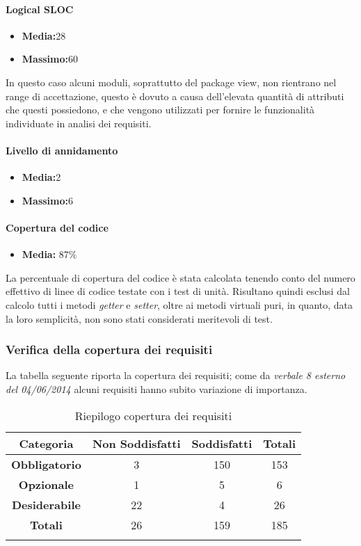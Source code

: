 \paragraph{Logical SLOC}
\begin{itemize}
\item{\textbf{Media:}28} 
\item{\textbf{Massimo:}60}
\end{itemize}
In questo caso alcuni moduli, soprattutto del package view, non rientrano nel range di accettazione, questo è dovuto a causa dell'elevata quantità di attributi che questi possiedono, e che vengono utilizzati per fornire le funzionalità individuate in analisi dei requisiti.

\paragraph{Livello di annidamento}
\begin{itemize}
\item{\textbf{Media:}2}
\item{\textbf{Massimo:}6} 
\end{itemize}


\paragraph{Copertura del codice}
\begin{itemize}
\item{\textbf{Media:} 87\%} 
\end{itemize}
La percentuale di copertura del codice è stata calcolata tenendo conto del numero effettivo di linee di codice testate con i test di unità. Risultano quindi esclusi dal calcolo tutti i metodi \emph{getter} e \emph{setter}, oltre ai metodi virtuali puri, in quanto, data la loro semplicità, non sono stati considerati meritevoli di test.


\subsubsection{Verifica della copertura dei requisiti}
La tabella seguente riporta la copertura dei requisiti; come da \emph{verbale 8 esterno del 04/06/2014} alcuni requisiti hanno subito variazione di importanza.
\begin{center}
\begin{longtable}{|c|c|c|c|}
\hline
\textbf{Categoria} & \textbf{Non Soddisfatti} & \textbf{Soddisfatti} & \textbf{Totali} \\
\hline
\textbf{Obbligatorio} &3 & 150 & 153 \\ 
\hline
\textbf{Opzionale} & 1 & 5 & 6 \\
\hline
\textbf{Desiderabile} & 22 & 4 & 26 \\
\hline
\textbf{Totali} & 26 & 159 & 185 \\
\hline
\caption{Riepilogo copertura dei requisiti}
\end{longtable}
\end{center}